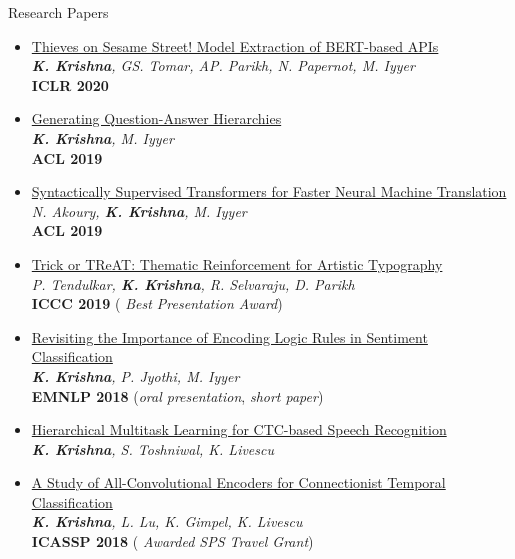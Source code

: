 \documentclass{resume} %
\begin{document}
\begin{rSection}{Research Papers}
\vspace*{0.1in}
\begin{itemize}[leftmargin=*]
\item \href{https://arxiv.org/abs/1910.12366}{Thieves on Sesame Street! Model Extraction of BERT-based APIs} \\ \textit{\textbf{K. Krishna}, GS. Tomar, AP. Parikh, N. Papernot, M. Iyyer} \\ \textbf{ICLR 2020}
\item \href{https://arxiv.org/abs/1906.02622}{Generating Question-Answer Hierarchies} \\ \textit{\textbf{K. Krishna}, M. Iyyer} \\ \textbf{ACL 2019}
\item \href{https://arxiv.org/abs/1906.02780}{Syntactically Supervised Transformers for Faster Neural Machine Translation} \\ \textit{N. Akoury, \textbf{K. Krishna}, M. Iyyer} \\ \textbf{ACL 2019}
\item \href{https://arxiv.org/abs/1903.07820}{Trick or TReAT: Thematic Reinforcement for Artistic Typography} \\ \textit{P. Tendulkar, \textbf{K. Krishna}, R. Selvaraju, D. Parikh} \\ \textbf{ICCC 2019} ({\color{red} \textit{Best Presentation Award}})
\item \href{https://arxiv.org/abs/1808.07733}{Revisiting the Importance of Encoding Logic Rules in Sentiment Classification} \\ \textit{\textbf{K. Krishna}, P. Jyothi, M. Iyyer} \\ \textbf{EMNLP 2018} ({\color{red}\textit{oral presentation}}, \textit{short paper})
\item \href{https://arxiv.org/abs/1807.06234}{Hierarchical Multitask Learning for CTC-based Speech Recognition} \\ \textit{\textbf{K. Krishna}, S. Toshniwal, K. Livescu}
\item \href{https://arxiv.org/abs/1710.10398}{A Study of All-Convolutional Encoders for Connectionist Temporal Classification}\\ \textit{\textbf{K. Krishna}, L. Lu, K. Gimpel,  K. Livescu}\\ \textbf{ICASSP 2018} ({\color{red} \textit{Awarded SPS Travel Grant}})
\end{itemize}
\end{rSection}
\end{document}
